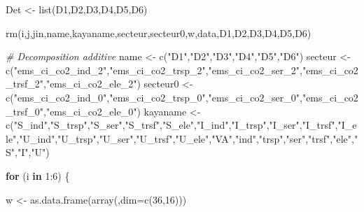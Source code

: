 \documentclass[
]{article}
\newenvironment{Shaded}{\begin{snugshade}}{\end{snugshade}}
\newcommand{\AttributeTok}[1]{\textcolor[rgb]{0.77,0.63,0.00}{#1}}
\newcommand{\CommentTok}[1]{\textcolor[rgb]{0.56,0.35,0.01}{\textit{#1}}}
\newcommand{\ControlFlowTok}[1]{\textcolor[rgb]{0.13,0.29,0.53}{\textbf{#1}}}
\newcommand{\DecValTok}[1]{\textcolor[rgb]{0.00,0.00,0.81}{#1}}
\newcommand{\FunctionTok}[1]{\textcolor[rgb]{0.00,0.00,0.00}{#1}}
\newcommand{\NormalTok}[1]{#1}
\newcommand{\OtherTok}[1]{\textcolor[rgb]{0.56,0.35,0.01}{#1}}
\newcommand{\SpecialCharTok}[1]{\textcolor[rgb]{0.00,0.00,0.00}{#1}}
\newcommand{\StringTok}[1]{\textcolor[rgb]{0.31,0.60,0.02}{#1}}
\begin{document}
\begin{Shaded}
\begin{Highlighting}[]
\NormalTok{Det }\OtherTok{\textless{}{-}} \FunctionTok{list}\NormalTok{(D1,D2,D3,D4,D5,D6)}

\FunctionTok{rm}\NormalTok{(i,j,jin,name,kayaname,secteur,secteur0,w,data,D1,D2,D3,D4,D5,D6)}
\end{Highlighting}
\end{Shaded}

\begin{Shaded}
\begin{Highlighting}[]
\CommentTok{\# Decomposition additive}
\NormalTok{name }\OtherTok{\textless{}{-}} \FunctionTok{c}\NormalTok{(}\StringTok{"D1"}\NormalTok{,}\StringTok{"D2"}\NormalTok{,}\StringTok{"D3"}\NormalTok{,}\StringTok{"D4"}\NormalTok{,}\StringTok{"D5"}\NormalTok{,}\StringTok{"D6"}\NormalTok{)}
\NormalTok{secteur }\OtherTok{\textless{}{-}} \FunctionTok{c}\NormalTok{(}\StringTok{"ems\_ci\_co2\_ind\_2"}\NormalTok{,}\StringTok{"ems\_ci\_co2\_trsp\_2"}\NormalTok{,}\StringTok{"ems\_ci\_co2\_ser\_2"}\NormalTok{,}\StringTok{"ems\_ci\_co2\_trsf\_2"}\NormalTok{,}\StringTok{"ems\_ci\_co2\_ele\_2"}\NormalTok{)}
\NormalTok{secteur0 }\OtherTok{\textless{}{-}} \FunctionTok{c}\NormalTok{(}\StringTok{"ems\_ci\_co2\_ind\_0"}\NormalTok{,}\StringTok{"ems\_ci\_co2\_trsp\_0"}\NormalTok{,}\StringTok{"ems\_ci\_co2\_ser\_0"}\NormalTok{,}\StringTok{"ems\_ci\_co2\_trsf\_0"}\NormalTok{,}\StringTok{"ems\_ci\_co2\_ele\_0"}\NormalTok{)}
\NormalTok{kayaname }\OtherTok{\textless{}{-}} \FunctionTok{c}\NormalTok{(}\StringTok{"S\_ind"}\NormalTok{,}\StringTok{"S\_trsp"}\NormalTok{,}\StringTok{"S\_ser"}\NormalTok{,}\StringTok{"S\_trsf"}\NormalTok{,}\StringTok{"S\_ele"}\NormalTok{,}\StringTok{"I\_ind"}\NormalTok{,}\StringTok{"I\_trsp"}\NormalTok{,}\StringTok{"I\_ser"}\NormalTok{,}\StringTok{"I\_trsf"}\NormalTok{,}\StringTok{"I\_ele"}\NormalTok{,}\StringTok{"U\_ind"}\NormalTok{,}\StringTok{"U\_trsp"}\NormalTok{,}\StringTok{"U\_ser"}\NormalTok{,}\StringTok{"U\_trsf"}\NormalTok{,}\StringTok{"U\_ele"}\NormalTok{,}\StringTok{"VA"}\NormalTok{,}\StringTok{"ind"}\NormalTok{,}\StringTok{"trsp"}\NormalTok{,}\StringTok{"ser"}\NormalTok{,}\StringTok{"trsf"}\NormalTok{,}\StringTok{"ele"}\NormalTok{,}\StringTok{"S"}\NormalTok{,}\StringTok{"I"}\NormalTok{,}\StringTok{"U"}\NormalTok{)}

\ControlFlowTok{for}\NormalTok{ (i }\ControlFlowTok{in} \DecValTok{1}\SpecialCharTok{:}\DecValTok{6}\NormalTok{) \{}
  
\NormalTok{  w }\OtherTok{\textless{}{-}} \FunctionTok{as.data.frame}\NormalTok{(}\FunctionTok{array}\NormalTok{(,}\AttributeTok{dim=}\FunctionTok{c}\NormalTok{(}\DecValTok{36}\NormalTok{,}\DecValTok{16}\NormalTok{)))}
  

\end{Highlighting}
\end{Shaded}
\end{document}
